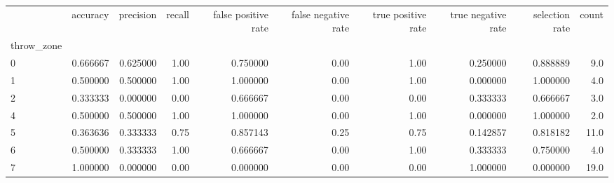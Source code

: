 \begin{tabular}{lrrrrrrrrr}
\toprule
{} &  accuracy &  precision &  recall &  false positive rate &  false negative rate &  true positive rate &  true negative rate &  selection rate &  count \\
throw\_zone &           &            &         &                      &                      &                     &                     &                 &        \\
\midrule
0          &  0.666667 &   0.625000 &    1.00 &             0.750000 &                 0.00 &                1.00 &            0.250000 &        0.888889 &    9.0 \\
1          &  0.500000 &   0.500000 &    1.00 &             1.000000 &                 0.00 &                1.00 &            0.000000 &        1.000000 &    4.0 \\
2          &  0.333333 &   0.000000 &    0.00 &             0.666667 &                 0.00 &                0.00 &            0.333333 &        0.666667 &    3.0 \\
4          &  0.500000 &   0.500000 &    1.00 &             1.000000 &                 0.00 &                1.00 &            0.000000 &        1.000000 &    2.0 \\
5          &  0.363636 &   0.333333 &    0.75 &             0.857143 &                 0.25 &                0.75 &            0.142857 &        0.818182 &   11.0 \\
6          &  0.500000 &   0.333333 &    1.00 &             0.666667 &                 0.00 &                1.00 &            0.333333 &        0.750000 &    4.0 \\
7          &  1.000000 &   0.000000 &    0.00 &             0.000000 &                 0.00 &                0.00 &            1.000000 &        0.000000 &   19.0 \\
\bottomrule
\end{tabular}

